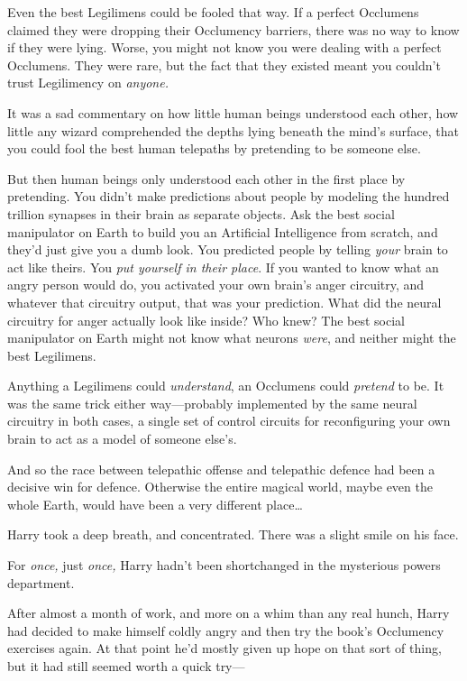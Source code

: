 Even the best Legilimens could be fooled that way. If a perfect Occlumens
claimed they were dropping their Occlumency barriers, there was no way to know
if they were lying. Worse, you might not know you were dealing with a perfect
Occlumens. They were rare, but the fact that they existed meant you couldn’t
trust Legilimency on \emph{anyone.}

It was a sad commentary on how little human beings understood each other, how
little any wizard comprehended the depths lying beneath the mind’s surface,
that you could fool the best human telepaths by pretending to be someone else.

But then human beings only understood each other in the first place by
pretending. You didn’t make predictions about people by modeling the hundred
trillion synapses in their brain as separate objects. Ask the best social
manipulator on Earth to build you an Artificial Intelligence from scratch, and
they’d just give you a dumb look. You predicted people by telling \emph{your}
brain to act like theirs. You \emph{put yourself in their place}. If you wanted
to know what an angry person would do, you activated your own brain’s anger
circuitry, and whatever that circuitry output, that was your prediction. What
did the neural circuitry for anger actually look like inside? Who knew? The
best social manipulator on Earth might not know what neurons \emph{were}, and
neither might the best Legilimens.

Anything a Legilimens could \emph{understand}, an Occlumens could
\emph{pretend} to be. It was the same trick either way—probably implemented
by the same neural circuitry in both cases, a single set of control circuits
for reconfiguring your own brain to act as a model of someone else’s.

And so the race between telepathic offense and telepathic defence had been a
decisive win for defence. Otherwise the entire magical world, maybe even the
whole Earth, would have been a very different place…

Harry took a deep breath, and concentrated. There was a slight smile on his
face.

For \emph{once,} just \emph{once,} Harry hadn’t been shortchanged in the
mysterious powers department.

After almost a month of work, and more on a whim than any real hunch, Harry had
decided to make himself coldly angry and then try the book’s Occlumency
exercises again. At that point he’d mostly given up hope on that sort of thing,
but it had still seemed worth a quick try—

